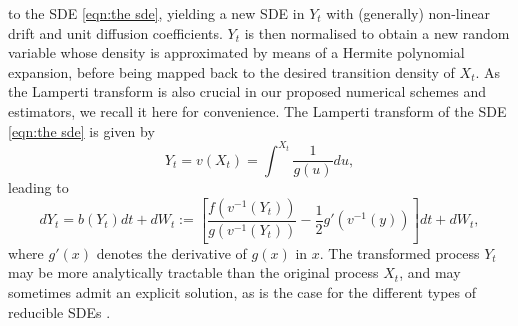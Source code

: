 \documentclass[a4paper,12pt]{article}
\numberwithin{equation}{section}
\theoremstyle{plain}
\theoremstyle{definition}
\begin{document}
 to the SDE \eqref{eqn:the sde}, yielding a new SDE in $Y_t$ with (generally) non-linear drift and unit diffusion coefficients. $Y_t$ is then normalised to obtain a new random variable whose density  is approximated by means of a Hermite polynomial expansion, before being mapped back to the desired transition density of $X_t$. As the Lamperti transform is also crucial in our proposed numerical schemes and estimators, we recall it here for convenience. The Lamperti transform of the SDE \eqref{eqn:the sde}
 is given by
\begin{equation}\label{eqn:Lamperti transform}
    Y_t=v(X_t)=\int^{X_t}\frac{1}{g(u)}du,
\end{equation}
leading to 
  \begin{equation}\label{Lamperti}
    dY_t=
    b(Y_t)dt+dW_t:=
    \left[\frac{f\left(v^{-1}(Y_t)\right)}{g\left(v^{-1}(Y_t)\right)}-\frac{1}{2} g'\left(v^{-1}(y)\right)\right]dt+dW_t,
\end{equation}
where $g'(x)$ denotes the derivative of $g(x)$ in $x$. The transformed process $Y_t$ may be more analytically tractable than the
original process $X_t$, and may sometimes admit an explicit
solution, as is the case for the different types of reducible SDEs \cite{kloeden_numerical_1992}. 
 
\end{document}
